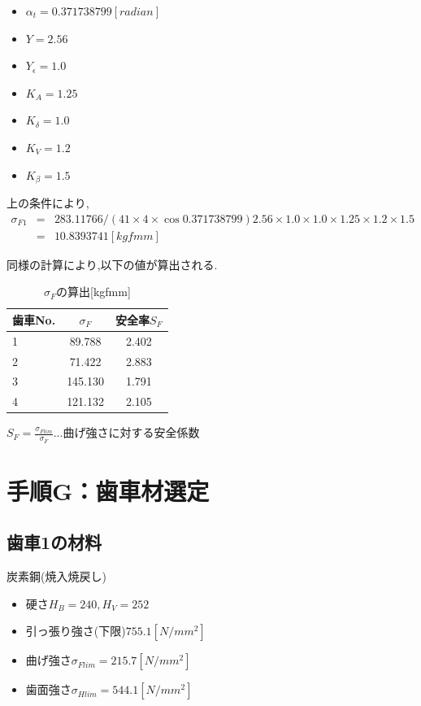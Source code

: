 \begin{itemize}
\item $\alpha_t=0.371738799[radian]$
\item $Y=2.56$
\item $Y_{\epsilon}=1.0$
\item $K_A=1.25$
\item $K_{\delta}=1.0$
\item $K_V=1.2$
\item $K_{\beta}=1.5$
\end{itemize}
上の条件により,
\begin{eqnarray}
\sigma_{F1}&=&283.11766/(41\times4\times\cos{0.371738799}) 2.56 \times 1.0 \times 1.0 \times 1.25 \times 1.2 \times 1.5\nonumber\\
&=&10.8393741 [kgfmm]\nonumber
\end{eqnarray}

同様の計算により,以下の値が算出される.

\begin{table}[htb]
\begin{center}
  \caption{$\sigma_F$の算出[kgfmm]}
  \begin{tabular}{|l|c|c|} \hline
    歯車No.     &$\sigma_F$ &安全率$S_F$\\\hline
    1           &89.788   &2.402\\
    2           &71.422   &2.883\\
    3           &145.130  &1.791\\
    4           &121.132  &2.105\\
    \hline
  \end{tabular}
\end{center}
\end{table}
$S_F=\frac{\sigma_{Flim}}{\sigma_{F}}...曲げ強さに対する安全係数$\\

\section{手順G：歯車材選定}
\subsection{歯車1の材料}
炭素鋼(焼入焼戻し)
\begin{itemize}
\item 硬さ$ H_B = 240,H_V=252$
\item 引っ張り強さ(下限)$755.1[N/mm^2]$
\item 曲げ強さ$\sigma_{Flim}=215.7[N/mm^2]$
\item 歯面強さ$\sigma_{Hlim}=544.1[N/mm^2]$
\end{itemize}
